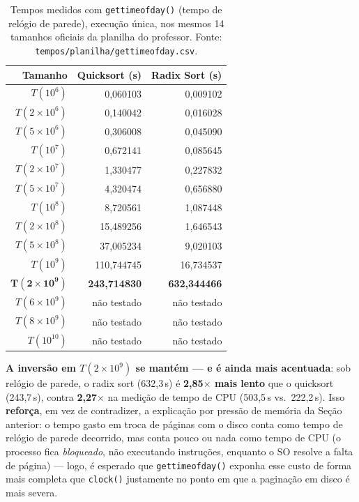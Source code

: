 \documentclass[11pt,a4paper]{article}
\newcommand{\barra}{/\allowbreak}
\renewcommand{\_}{\underscoreoriginal\allowbreak}
\begin{document}
\begin{table}[H]
\centering
\caption{Tempos medidos com \texttt{gettimeofday()} (tempo de relógio de
parede), execução única, nos mesmos 14 tamanhos oficiais da planilha do
professor. Fonte: \texttt{tempos\barra{}planilha\barra{}gettimeofday.csv}.}
\label{tab:gettimeofday}
\begin{tabular}{r r r}
\toprule
\rowcolor{tablehead}
Tamanho & Quicksort (s) & Radix Sort (s)\\
\midrule
$T(10^6)$  & 0,060103  & 0,009102\\
$T(2\times10^6)$  & 0,140042  & 0,016028\\
$T(5\times10^6)$  & 0,306008  & 0,045090\\
$T(10^7)$  & 0,672141  & 0,085645\\
$T(2\times10^7)$  & 1,330477  & 0,227832\\
$T(5\times10^7)$  & 4,320474  & 0,656880\\
$T(10^8)$  & 8,720561  & 1,087448\\
$T(2\times10^8)$  & 15,489256 & 1,646543\\
$T(5\times10^8)$  & 37,005234 & 9,020103\\
$T(10^9)$  & 110,744745 & 16,734537\\
$\mathbf{T(2\times10^9)}$  & \textbf{243,714830} & \textbf{632,344466}\\
$T(6\times10^9)$  & não testado & não testado\\
$T(8\times10^9)$  & não testado & não testado\\
$T(10^{10})$ & não testado & não testado\\
\bottomrule
\end{tabular}
\end{table}

\textbf{A inversão em $T(2\times10^9)$ se mantém --- e é ainda mais
acentuada}: sob relógio de parede, o radix sort (632,3\,s) é
\textbf{2,85$\times$ mais lento} que o quicksort (243,7\,s), contra
\textbf{2,27$\times$} na medição de tempo de CPU (503,5\,s vs.\
222,2\,s). Isso \textbf{reforça}, em vez de contradizer, a explicação
por pressão de memória da Seção anterior: o tempo gasto em troca de
páginas com o disco conta como tempo de relógio de parede decorrido,
mas conta pouco ou nada como tempo de CPU (o processo fica
\emph{bloqueado}, não executando instruções, enquanto o SO resolve a
falta de página) --- logo, é esperado que \texttt{gettimeofday()}
exponha esse custo de forma mais completa que \texttt{clock()}
justamente no ponto em que a paginação em disco é mais severa.
\end{document}
